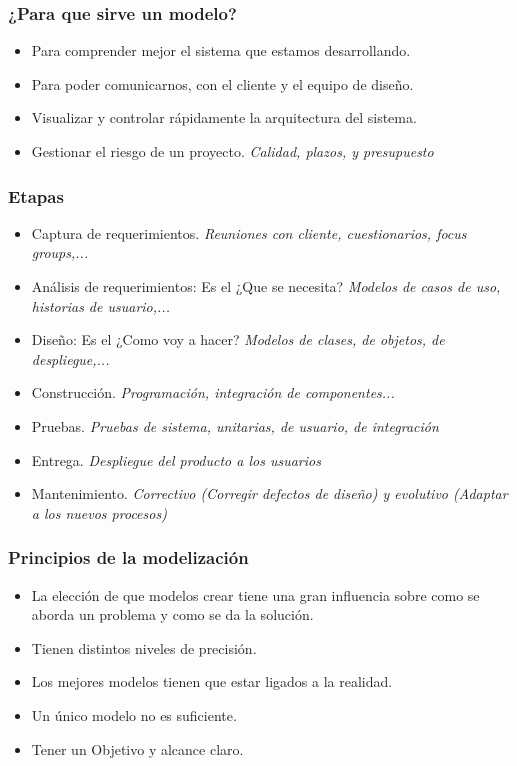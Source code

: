 \documentclass[titlepage,a4paper]{article}
\begin{document}
\subsubsection*{¿Para que sirve un modelo?}
\begin{itemize}
    \item Para comprender mejor el sistema que estamos desarrollando.
    \item Para poder comunicarnos, con el cliente y el equipo de diseño.
    \item Visualizar y controlar rápidamente la arquitectura del sistema.
    \item Gestionar el riesgo de un proyecto. \textit{Calidad, plazos, y presupuesto}
\end{itemize}

\subsubsection*{Etapas}
\begin{itemize}
    \item Captura de requerimientos. \textit{Reuniones con cliente, cuestionarios, focus groups,...}
    \item Análisis de requerimientos: Es el ¿Que se necesita? \textit{Modelos de casos de uso, historias de usuario,...}
    \item Diseño: Es el ¿Como voy a hacer? \textit{Modelos de clases, de objetos, de despliegue,...}
    \item Construcción. \textit{Programación, integración de componentes...}
    \item Pruebas. \textit{Pruebas de sistema, unitarias, de usuario, de integración}
    \item Entrega. \textit{Despliegue del producto a los usuarios}
    \item Mantenimiento. \textit{Correctivo (Corregir defectos de diseño) y evolutivo (Adaptar a los nuevos procesos)}
\end{itemize}

\subsubsection{Principios de la modelización}
\begin{itemize}
    \item La elección de que modelos crear tiene una gran influencia sobre como se aborda un problema y como se da la solución.
    \item Tienen distintos niveles de precisión.
    \item Los mejores modelos tienen que estar ligados a la realidad.
    \item Un único modelo no es suficiente.
    \item Tener un Objetivo y alcance claro.
\end{itemize}
\end{document}
